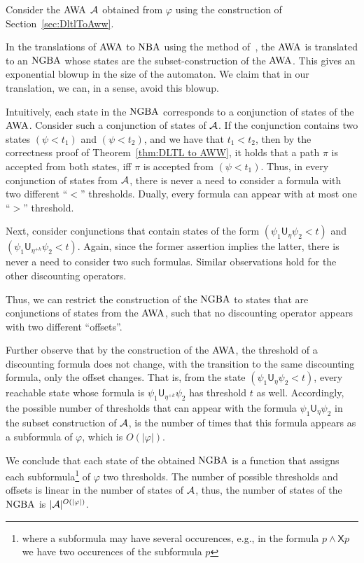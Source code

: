 \documentclass{llncs}
\newcommand{\Next}{\mathsf{X}}
\newcommand{\Until}{\mathsf{U}}
\newcommand{\NGBW}{\mbox{\rm NGBA}\xspace}
\newcommand{\NBW}{\mbox{\rm NBA}\xspace}
\newcommand{\AWW}{\mbox{\rm AWA}\xspace}
\newcommand{\A}{{\cal A}}
\renewcommand{\phi}{\varphi}
\newcommand{\df}{\eta}
\begin{document}
Consider the $\AWW$ $\A$ obtained from $\phi$ using the construction of Section~\ref{sec:DltlToAww}.

In the translations of $\AWW$ to $\NBW$ using the method of~\cite{GO01}, the $\AWW$ is translated to an $\NGBW$ whose states are the subset-construction of the $\AWW$.
This gives an exponential blowup in the size of the automaton. We claim that in our translation, we can, in a sense, avoid this blowup.

Intuitively, each state in the $\NGBW$ corresponds to a conjunction of states of the $\AWW$. Consider such a conjunction of states of $\A$. If the conjunction contains two states $(\psi<t_1)$ and $(\psi < t_2)$, and we have that $t_1<t_2$, then by the correctness proof of Theorem~\ref{thm:DLTL to AWW}, it holds that a path $\pi$ is accepted from both states, iff $\pi$ is accepted from $(\psi<t_1)$. Thus, in every conjunction of states from $\A$, there is never a need to consider a formula with two different ``$<$'' thresholds. Dually, every formula can appear with at most one ``$>$'' threshold.

Next, consider conjunctions that contain states of the form $(\psi_1\Until_\df \psi_2<t)$ and $(\psi_1\Until_{\df^{+k}} \psi_2<t)$. Again, since the former assertion implies the latter, there is never a need to consider two such formulas. Similar observations hold for the other discounting operators.

Thus, we can restrict the construction of the $\NGBW$ to states that are conjunctions of states from the $\AWW$, such that no discounting operator appears with two different ``offsets''.

Further observe that by the construction of the $\AWW$, the threshold of a discounting formula does not change, with the transition to the same discounting formula, only the offset changes. That is, from the state $(\psi_1\Until_\df \psi_2<t)$, every reachable state whose formula is $\psi_1\Until_{\df^{+k}} \psi_2$ has threshold $t$ as well. Accordingly, the possible number of thresholds that can appear with the formula $\psi_1\Until_\df \psi_2$ in the subset construction of $\A$, is the number of times that this formula appears as a subformula of $\phi$, which is $O(|\phi|)$.

We conclude that each state of the obtained $\NGBW$ is a function that assigns each subformula\footnote{where a subformula may have several occurences, e.g., in the formula $p\wedge \Next p$ we have two occurences of the subformula $p$} of $\phi$ two thresholds.
The number of possible thresholds and offsets is linear in the number of states of $\A$, thus, the number of states of the $\NGBW$ is $|\A|^{O(|\phi|)}$.
\end{document}
